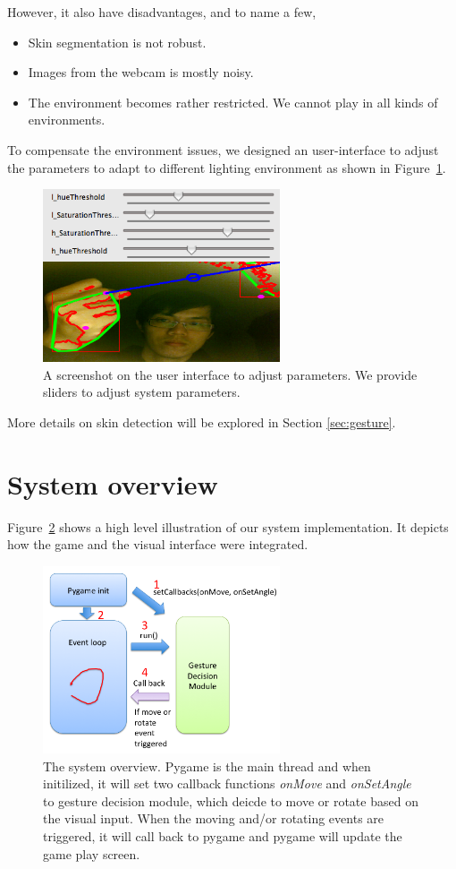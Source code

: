 \documentclass[10pt,twocolumn,letterpaper]{article}
\begin{document}
However, it also have disadvantages, and to name a few,
\begin{itemize}
	\item Skin segmentation is not robust.
	\item Images from the webcam is mostly noisy.
	\item The environment becomes rather restricted. We cannot play in all kinds of environments.
\end{itemize}
To compensate the environment issues, we designed an user-interface 
to adjust the parameters to adapt to different lighting environment as shown in Figure~\ref{fig:adjusting}. 

\begin{figure}[h]
\centering
\includegraphics[width=7cm]{adjustui.png}
\caption{A screenshot on the user interface to adjust parameters. We provide 
sliders to adjust system parameters.}
\label{fig:adjusting}
\end{figure}

More details on skin detection will be explored in Section \ref{sec:gesture}.

\section{System overview}
Figure~\ref{fig:system} shows a high level illustration of 
our system implementation. It depicts how the game 
and the visual interface were integrated.

\begin{figure}[h]
\centering
\includegraphics[width=7cm]{systemover.png}
\caption{The system overview. Pygame is the main thread and when 
initilized, it will set two callback functions \emph{onMove} and \emph{onSetAngle}
 to gesture decision module, which deicde to move or rotate based 
 on the visual input. When the moving and/or rotating events are triggered, 
 it will call back to pygame and pygame will update the game play screen. }
\label{fig:system}
\end{figure}
\end{document}
